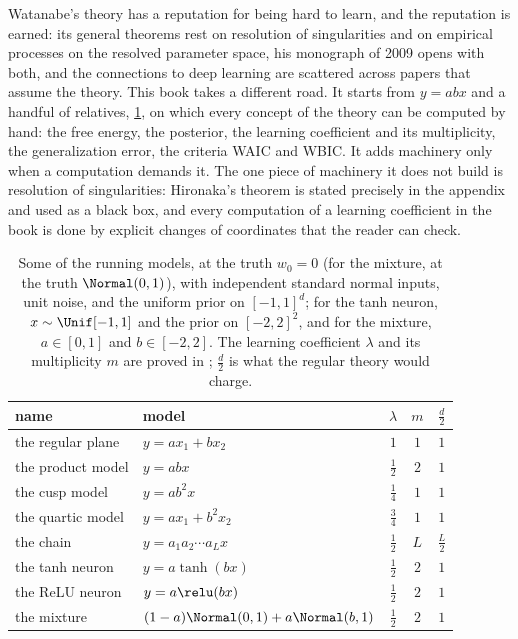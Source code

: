 \begin{refsection}
Watanabe's theory has a reputation for being hard to learn, and the reputation is earned: its general theorems rest on resolution of singularities and on empirical processes on the resolved parameter space, his monograph of 2009 opens with both, and the connections to deep learning are scattered across papers that assume the theory. This book takes a different road. It starts from $y=abx$ and a handful of relatives, \cref{tab:prologue:models}, on which every concept of the theory can be computed by hand: the free energy, the posterior, the learning coefficient and its multiplicity, the generalization error, the criteria WAIC and WBIC. It adds machinery only when a computation demands it. The one piece of machinery it does not build is resolution of singularities: Hironaka's theorem is stated precisely in the appendix and used as a black box, and every computation of a learning coefficient in the book is done by explicit changes of coordinates that the reader can check.

\begin{table}[t]
\centering
\small
\begin{tabular}{@{}llccc@{}}
\toprule
name & model & $\lambda$ & $m$ & $\tfrac d2$\\
\midrule
the regular plane & $y=ax_1+bx_2$ & $1$ & $1$ & $1$\\
the product model & $y=abx$ & $\tfrac12$ & $2$ & $1$\\
the cusp model & $y=ab^2x$ & $\tfrac14$ & $1$ & $1$\\
the quartic model & $y=ax_1+b^2x_2$ & $\tfrac34$ & $1$ & $1$\\
the chain & $y=a_1a_2\cdots a_Lx$ & $\tfrac12$ & $L$ & $\tfrac L2$\\
the tanh neuron & $y=a\tanh(bx)$ & $\tfrac12$ & $2$ & $1$\\
the ReLU neuron & $y=a\relu(bx)$ & $\tfrac12$ & $2$ & $1$\\
the mixture & $(1-a)\Normal(0,1)+a\Normal(b,1)$ & $\tfrac12$ & $2$ & $1$\\
\bottomrule
\end{tabular}
\caption{Some of the running models, at the truth $w_0=0$ (for the mixture, at the truth $\Normal(0,1)$), with independent standard normal inputs, unit noise, and the uniform prior on $[-1,1]^d$; for the tanh neuron, $x\sim\Unif[-1,1]$ and the prior on $[-2,2]^2$, and for the mixture, $a\in[0,1]$ and $b\in[-2,2]$. The learning coefficient $\lambda$ and its multiplicity $m$ are proved in ; $\tfrac d2$ is what the regular theory would charge.}\label{tab:prologue:models}
\end{table}


\end{refsection}
